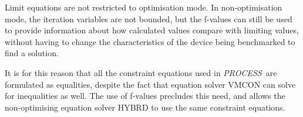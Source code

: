 \documentclass[11pt,a4paper]{report}
\newcommand{\PS}{\mbox{\it PROCESS\/ }}
\begin{document}
Limit equations are not restricted to optimisation mode. In non-optimisation
mode, the iteration variables are not bounded, but the f-values can still be
used to provide information about how calculated values compare with limiting
values, without having to change the characteristics of the device being
benchmarked to find a solution.

It is for this reason that all the constraint equations used in \PS are
formulated as equalities, despite the fact that equation solver VMCON can
solve for inequalities as well. The use of f-values precludes this need, and
allows the non-optimising equation solver HYBRD to use the same constraint
equations.


\begin{table}[tbph]
\footnotesize
\begin{center}


\end{center}
\end{table}
\end{document}
